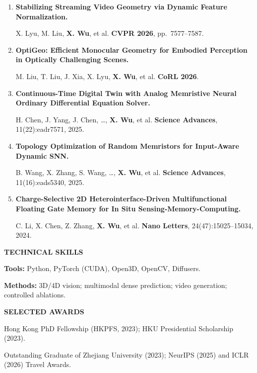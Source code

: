 \documentclass[a4paper]{article}
\newcommand{\cvsection}[1]{%
  \par\vspace{2.0pt}%
  {\color{cvblue}\fontsize{11}{12.2}\selectfont\bfseries\MakeUppercase{#1}}\par
  \vspace{-4pt}{\color{cvblue}\rule{\textwidth}{0.4pt}}\par\vspace{1.0pt}%
}
\begin{document}
{\begin{enumerate}[resume,leftmargin=1.6em,labelsep=0.38em,itemsep=0.4pt,topsep=1.3pt,parsep=0pt,partopsep=0pt]
M. Liu, X. Lyu, T. Ren, P. Dai, \textbf{X. Wu}, et al. \hfill \textbf{ECCV 2026}.
\item \textbf{Stabilizing Streaming Video Geometry via Dynamic Feature Normalization.}\par
X. Lyu, M. Liu, \textbf{X. Wu}, et al. \hfill \textbf{CVPR 2026}, pp.\ 7577--7587.
\item \textbf{OptiGeo: Efficient Monocular Geometry for Embodied Perception in Optically Challenging Scenes.}\par
M. Liu, T. Liu, J. Xia, X. Lyu, \textbf{X. Wu}, et al. \hfill \textbf{CoRL 2026}.
\item \textbf{Continuous-Time Digital Twin with Analog Memristive Neural Ordinary Differential Equation Solver.}\par
H. Chen, J. Yang, J. Chen, \ldots, \textbf{X. Wu}, et al. \hfill \textbf{Science Advances}, 11(22):eadr7571, 2025.
\item \textbf{Topology Optimization of Random Memristors for Input-Aware Dynamic SNN.}\par
B. Wang, X. Zhang, S. Wang, \ldots, \textbf{X. Wu}, et al. \hfill \textbf{Science Advances}, 11(16):eads5340, 2025.
\item \textbf{Charge-Selective 2D Heterointerface-Driven Multifunctional Floating Gate Memory for In Situ Sensing-Memory-Computing.}\par
C. Li, X. Chen, Z. Zhang, \textbf{X. Wu}, et al. \hfill \textbf{Nano Letters}, 24(47):15025--15034, 2024.
\end{enumerate}}

\cvsection{Technical Skills}
\textbf{Tools:} Python, PyTorch (CUDA), Open3D, OpenCV, Diffusers.\par
\textbf{Methods:} 3D/4D vision; multimodal dense prediction; video generation; controlled ablations.


\cvsection{Selected Awards}
Hong Kong PhD Fellowship (HKPFS, 2023); HKU Presidential Scholarship (2023).\par
Outstanding Graduate of Zhejiang University (2023); NeurIPS (2025) and ICLR (2026) Travel Awards.
\end{document}
